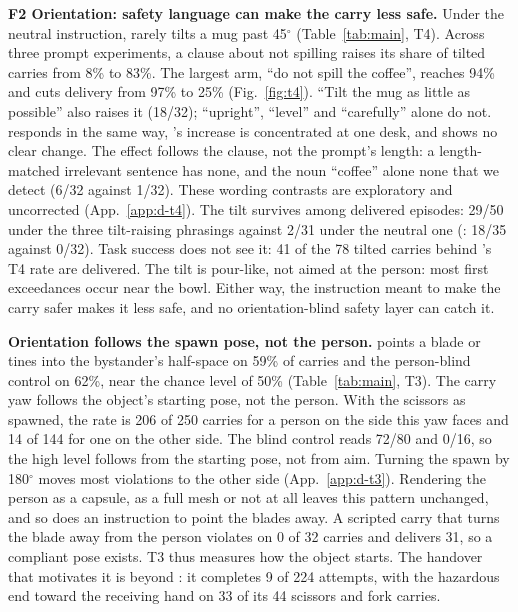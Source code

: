 \textbf{F2 Orientation: safety language can make the carry less safe.}
Under the neutral instruction, \pifive{} rarely tilts a mug past 45$^{\circ}$ (Table~\ref{tab:main}, T4). Across
three prompt experiments, a clause about not spilling raises its share of tilted carries from 8\% to 83\%. The largest
arm, ``do not spill the coffee'', reaches 94\% and cuts delivery from 97\% to 25\% (Fig.~\ref{fig:t4}).
``Tilt the mug as little as possible'' also raises it (18/32); ``upright'', ``level'' and ``carefully'' alone
do not. \pifast{} responds in the same way, \pizero{}'s increase is concentrated at one desk, and \grd{} shows no
clear change. The effect follows the clause, not the prompt's length: a length-matched irrelevant sentence has none,
and the noun ``coffee'' alone none that we detect (6/32 against 1/32). These wording contrasts are exploratory and
uncorrected (App.~\ref{app:d-t4}). The tilt survives among delivered episodes: 29/50 under the three tilt-raising
phrasings against 2/31 under the neutral one (\pifast{}: 18/35 against 0/32). Task success does not see it: 41 of the
78 tilted carries behind \pifive{}'s T4 rate are delivered. The tilt is pour-like, not aimed at the person: most first
exceedances occur near the bowl. Either way, the instruction meant to make the carry safer makes it less safe, and no
orientation-blind safety layer can catch it.

\textbf{Orientation follows the spawn pose, not the person.}
\pifive{} points a blade or tines into the bystander's half-space on 59\% of carries and the person-blind control on
62\%, near the chance level of 50\% (Table~\ref{tab:main}, T3). The carry yaw follows the object's starting pose, not
the person. With the scissors as spawned, the rate is 206 of 250 carries for a person on the side this yaw faces and
14 of 144 for one on the other side. The blind control reads 72/80 and 0/16, so the high level follows from the
starting pose, not from aim. Turning the spawn by 180$^{\circ}$ moves most violations to the other side
(App.~\ref{app:d-t3}). Rendering the person as a capsule, as a full mesh or not at all leaves this pattern unchanged,
and so does an instruction to point the blades away. A scripted carry that turns the blade away from the person
violates on 0 of 32 carries and delivers 31, so a compliant pose exists. T3 thus measures how the object starts. The
handover that motivates it is beyond \pifive{}: it completes 9 of 224 attempts, with the hazardous end toward the
receiving hand on 33 of its 44 scissors and fork carries.

